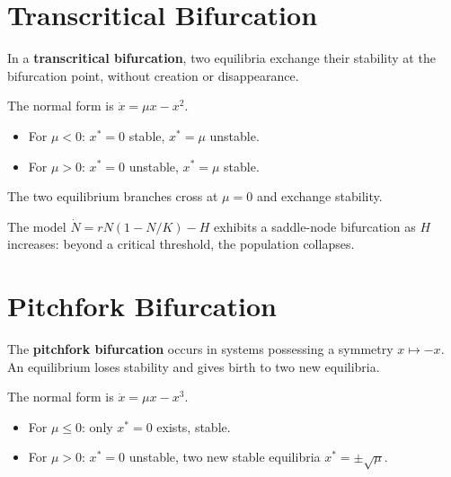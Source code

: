 \section{Transcritical Bifurcation}

\begin{definition}
In a \textbf{transcritical bifurcation}, two equilibria exchange their
stability at the bifurcation point, without creation or disappearance.
\end{definition}

\begin{theorem}
The normal form is $\dot{x} = \mu x - x^2$.
\begin{itemize}
    \item For $\mu < 0$: $x^* = 0$ stable, $x^* = \mu$ unstable.
    \item For $\mu > 0$: $x^* = 0$ unstable, $x^* = \mu$ stable.
\end{itemize}
The two equilibrium branches cross at $\mu = 0$ and exchange stability.
\end{theorem}

\begin{example}
The model $\dot{N} = rN(1 - N/K) - H$ exhibits a saddle-node bifurcation
as $H$ increases: beyond a critical threshold, the population collapses.
\end{example}

\section{Pitchfork Bifurcation}

\begin{definition}
The \textbf{pitchfork bifurcation} occurs in systems possessing a symmetry
$x \mapsto -x$. An equilibrium loses stability and gives birth to two new
equilibria.
\end{definition}

\begin{theorem}
The normal form is $\dot{x} = \mu x - x^3$.
\begin{itemize}
    \item For $\mu \leq 0$: only $x^* = 0$ exists, stable.
    \item For $\mu > 0$: $x^* = 0$ unstable, two new stable equilibria
    $x^* = \pm\sqrt{\mu}$.
\end{itemize}
\end{theorem}

